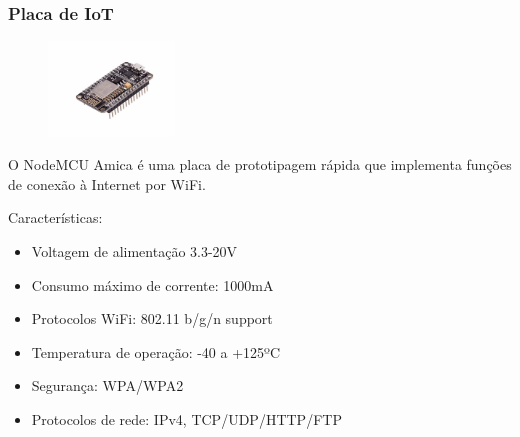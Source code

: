 \documentclass{beamer}
\begin{document}
\begin{frame}
\frametitle{Placa de IoT}
\begin{minipage}{\textwidth}
		
	\begin{figure}
		\begin{center}
			\includegraphics[width=0.3\textwidth]{NodeMCUAmica.jpg}
		\end{center}
	\end{figure}

	O NodeMCU Amica é uma placa de prototipagem rápida que implementa funções de conexão à Internet por WiFi.
	
	Características:

	\begin{itemize}
		\item Voltagem de alimentação 3.3-20V 
		\item Consumo máximo de corrente: 1000mA%
		\item Protocolos WiFi: 802.11 b/g/n support
		\item Temperatura de operação: -40 a +125ºC
		\item Segurança: WPA/WPA2
		\item Protocolos de rede: IPv4, TCP/UDP/HTTP/FTP
	\end{itemize}

\end{minipage}
\end{frame}
\end{document}
